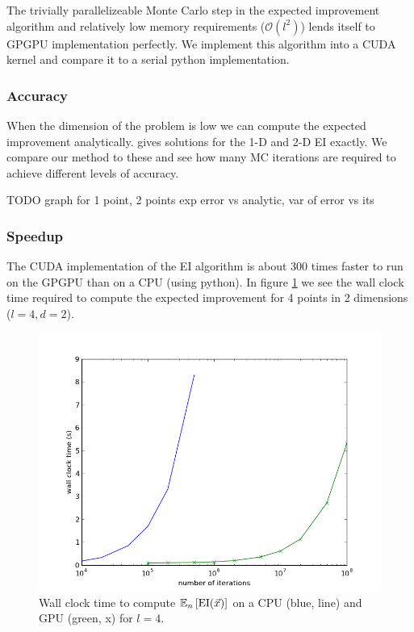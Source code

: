 \documentclass[phd,tocprelim]{cornell}
\begin{document}
The trivially parallelizeable Monte Carlo step in the expected improvement algorithm and relatively low memory requirements ($\mathcal{O}(l^{2})$) lends itself to GPGPU implementation perfectly. We implement this algorithm into a CUDA kernel and compare it to a serial python implementation.

\subsubsection{Accuracy}

When the dimension of the problem is low we can compute the expected improvement analytically. \cite{Ginsbourger2008} gives solutions for the 1-D and 2-D EI exactly. We compare our method to these and see how many MC iterations are required to achieve different levels of accuracy.

TODO
graph for 1 point, 2 points exp error vs analytic, var of error vs its

\subsubsection{Speedup}

The CUDA implementation of the EI algorithm is about 300 times faster to run on the GPGPU than on a CPU (using python). In figure \ref{GPUspeed1} we see the wall clock time required to compute the expected improvement for 4 points in 2 dimensions ($l=4, d=2$).

 \begin{figure}[hpt]
 	\centerline{\includegraphics[width=\textwidth]{figures/EPI/exp_EI_speedup_vs_its.png}}
    \caption[CPU vs GPU time to compute EI]{Wall clock time to compute $\mathbb{E}_{n}\left[{\rm EI}(\vec{x})\right]$ on a CPU (blue, line) and GPU (green, x) for $l = 4$.}
 	\label{GPUspeed1}
 \end{figure}
\end{document}
